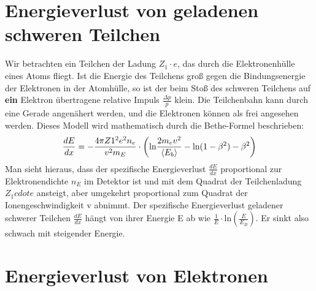 \documentclass[Ex4_Zusammenfassung.tex]{subfiles}
\begin{document}
\section{Energieverlust von geladenen schweren Teilchen}
Wir betrachten ein Teilchen der Ladung $Z_1 \cdot e $, das durch die Elektronenhülle eines Atoms fliegt. Ist die Energie des Teilchens groß gegen die Bindungsenergie der Elektronen in der Atomhülle, so ist der beim Stoß des schweren Teilchens auf \textbf{ein} Elektron  übertragene relative Impuls $\frac{\Delta p}{p}$ klein. Die Teilchenbahn kann durch eine Gerade angenähert werden, und die Elektronen können als frei angesehen werden.
Dieses Modell wird mathematisch durch die Bethe-Formel beschrieben:
\begin{equation}
\frac{dE}{dx} = - \frac{4 \pi Z1^2 e^2 n_e}{v^2 m_E} \cdot \left( \text{ln} \frac{2 m_e v^2}{\braket{E_b}} - \text{ln}(1-\beta^2) - \beta^2 \right )
\end{equation}
Man sieht hieraus, dass der spezifische Energieverlust $\frac{dE}{dx}$ proportional zur Elektronendichte $n_E$ im Detektor ist und mit dem Quadrat der Teilchenladung $Z_1 cdot e$ ansteigt, aber umgekehrt proportional zum Quadrat der Ionengeschwindigkeit v abnimmt. Der spezifische Energieverlust geladener schwerer Teilchen $\frac{dE}{dx} $ hängt von ihrer Energie E ab wie $ \frac{1}{E} \cdot \text{ln} (\frac{E}{E_B}) $. Er sinkt also schwach mit steigender Energie.
\section{Energieverlust von Elektronen}
\end{document}
